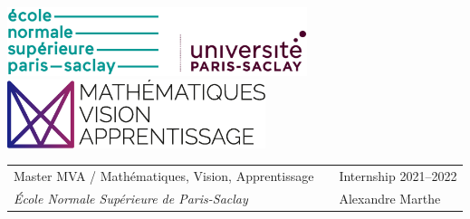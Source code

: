 \setlength{\parindent}{0pt}

\thispagestyle{empty}

\includegraphics[height=2cm]{figures/couverture/ens_ps.png} \hfill \includegraphics[height=2cm]{figures/couverture/logo_mva.eps}

\vspace{0.5cm}

\begin{tabularx}{\textwidth}{@{} l X l @{} }
{\sc Master MVA / Mathématiques, Vision, Apprentissage} & & Internship 2021--2022 \\
{\it École Normale Supérieure de Paris-Saclay} & & Alexandre \sc Marthe \\
\end{tabularx}

